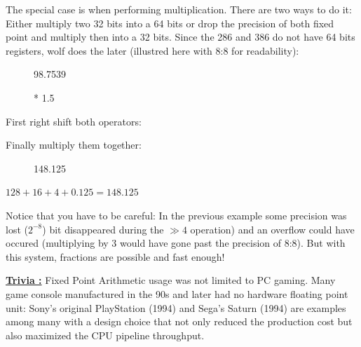 The special case is when performing multiplication. There are two ways to do it: Either multiply two 32 bits into a 64 bits or drop the precision of both fixed point and multiply then into a 32 bits. Since the 286 and 386 do not have 64 bits registers, wolf does the later (illustred here with 8:8 for readability):


\par
\begin{figure}[H]
 \centering
   
   \caption{98.7539} 
\end{figure} 
\par
\begin{figure}[H]
 \centering
   
   \caption{* 1.5} 
\end{figure} 
\par
First right shift both operators:\\
\par
\begin{figure}[H]
 \centering
   
\end{figure} 
\par
\begin{figure}[H]
 \centering
   
\end{figure} 
\par

Finally multiply them together:

\begin{figure}[H]
 \centering
   
   \caption{148.125} 
\end{figure} 
$128 + 16 + 4 + 0.125 = 148.125 $


Notice that you have to be careful: In the previous example some precision was lost ($ 2^{-8}$) bit disappeared during the $\gg 4$ operation) and an overflow could have occured (multiplying by 3 would have gone past the precision of 8:8). But with this system, fractions are possible and fast enough!\\
\par
\begin{minipage}{\textwidth}
 
 \end{minipage}
\par
 \textbf{\underline{Trivia :}}  Fixed Point Arithmetic usage was not limited to PC gaming. Many game console manufactured in the 90s and later had no hardware floating point unit: Sony's original PlayStation (1994) and Sega's Saturn (1994) are examples among many with a design choice that not only reduced the production cost but also maximized the CPU pipeline throughput.
 
